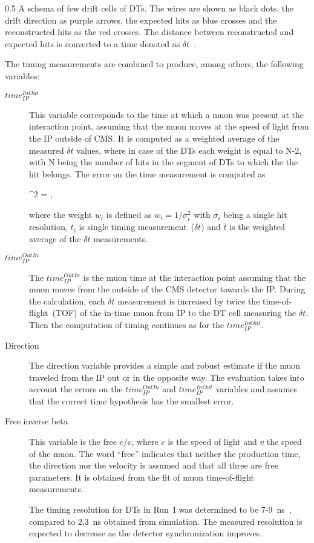                  {0.5}       %
                 { A schema of few drift cells of DTs. The wires are shown as black dots, the drift direction as purple arrows, the expected hits as blue crosses and the reconstructed hits as the red crosses. The distance between reconstructed and expected hits is converted to a time denoted as $\delta t$~\cite{Traczyk:1365029}. }

The timing measurements are combined to produce, among others, the following variables: 

\begin{description}
\item [$time_{IP}^{InOut}$]
This variable corresponds to the time at which a muon was present at the interaction point, assuming that the muon moves at the speed of light from the IP outside of CMS. It is computed as a weighted average of the measured $\delta t$ values, where in case of the DTs each weight is equal to N-2, with N being the number of hits in the segment of DTs to which the the hit belongs. The error on the time measurement is computed as

{
 \sigma^{2} =  \times {} \times {},
}

where the weight $w_{i}$ is defined as $w_i = 1/\sigma_{i}^2$ with $\sigma_{i}$ being a single hit resolution, $t_{i}$ is single timing measurement~($\delta t$) and $\bar{t}$ is the weighted average of the $\delta t$ measurements.

\item[$time_{IP}^{OutIn}$ ]
The $time_{IP}^{OutIn}$ is the muon time at the interaction point assuming that the muon moves from the outside of the CMS detector towards the IP. During the calculation, each $\delta t$ measurement is increased by twice the time-of-flight~(TOF) of the in-time muon from IP to the DT cell measuring the $\delta t$. Then the computation of timing continues as for the $time_{IP}^{InOut}$.

\item[Direction]
The direction variable provides a simple and robust estimate if the muon traveled from the IP out or in the opposite way. The evaluation takes into account the errors on the $time_{IP}^{OutIn}$ and $time_{IP}^{InOut}$ variables and assumes that the correct time hypothesis has the smallest error.

\item[Free inverse beta]
This variable is the free $c/v$, where $c$ is the speed of light and $v$ the speed of the muon. The word ``free'' indicates that neither the production time, the direction nor the velocity is assumed and that all three are free parameters. It is obtained from the fit of muon time-of-flight measurements.

The timing resolution for DTs in Run~I was determined to be 7-9~ns~\cite{Traczyk:1365029}, compared to 2.3~ns obtained from simulation. The measured resolution is expected to decrease as the detector synchronization improves.

\end{description}
